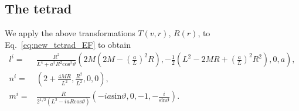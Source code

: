 \documentclass[12pt]{report}
\begin{document}
\subsection{The tetrad}
We apply the above transformations $T(v,r)$, $R(r)$,
to Eq.~\eqref{eq:new_tetrad_EF} to obtain
\begin{subequations}
\label{eq:tetrad_IEF_HC}
\begin{align}
	l^i 
	= &
	\frac{R^2}{L^4+a^2R^2\mathrm{cos}^2\vartheta}\left(
		2M\left(2M-\left(\frac{a}{L}\right)^2R\right),
	-	\frac{1}{2}\left(L^2-2MR+\left(\frac{a}{L}\right)^2R^2\right),
		0,
		a
	\right)
	, \\
	n^i 
	= &
	\left(
		2+\frac{4MR}{L^2},\frac{R^2}{L^2},0,0
	\right)
	, \\
	m^i
	= &
	\frac{R}{2^{1/2}\left(L^2-iaR\mathrm{cos}\vartheta\right)}
	\left(
		-ia\mathrm{sin}\vartheta,
		0,
		-1,
		-\frac{i}{\mathrm{sin}\vartheta}
	\right)
	.
\end{align}
\end{subequations}
\end{document}
